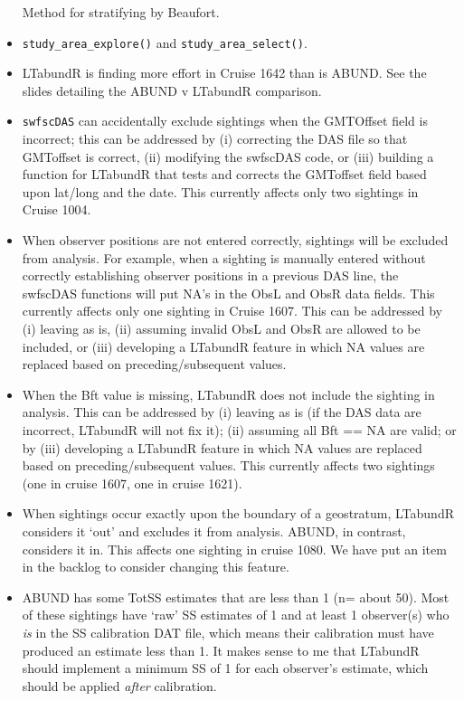 \documentclass[
]{book}
\begin{document}
\begin{itemize}
  Method for stratifying by Beaufort.
\item
  \texttt{study\_area\_explore()} and \texttt{study\_area\_select()}.
\item
  LTabundR is finding more effort in Cruise 1642 than is ABUND. See the slides detailing the ABUND v LTabundR comparison.
\item
  \texttt{swfscDAS} can accidentally exclude sightings when the GMTOffset field is incorrect; this can be addressed by (i) correcting the DAS file so that GMToffset is correct, (ii) modifying the swfscDAS code, or (iii) building a function for LTabundR that tests and corrects the GMToffset field based upon lat/long and the date. This currently affects only two sightings in Cruise 1004.
\item
  When observer positions are not entered correctly, sightings will be excluded from analysis. For example, when a sighting is manually entered without correctly establishing observer positions in a previous DAS line, the swfscDAS functions will put NA's in the ObsL and ObsR data fields. This currently affects only one sighting in Cruise 1607. This can be addressed by (i) leaving as is, (ii) assuming invalid ObsL and ObsR are allowed to be included, or (iii) developing a LTabundR feature in which NA values are replaced based on preceding/subsequent values.
\item
  When the Bft value is missing, LTabundR does not include the sighting in analysis. This can be addressed by (i) leaving as is (if the DAS data are incorrect, LTabundR will not fix it); (ii) assuming all Bft == NA are valid; or by (iii) developing a LTabundR feature in which NA values are replaced based on preceding/subsequent values. This currently affects two sightings (one in cruise 1607, one in cruise 1621).
\item
  When sightings occur exactly upon the boundary of a geostratum, LTabundR considers it `out' and excludes it from analysis. ABUND, in contrast, considers it in. This affects one sighting in cruise 1080. We have put an item in the backlog to consider changing this feature.
\item
  ABUND has some TotSS estimates that are less than 1 (n= about 50). Most of these sightings have `raw' SS estimates of 1 and at least 1 observer(s) who \emph{is} in the SS calibration DAT file, which means their calibration must have produced an estimate less than 1. It makes sense to me that LTabundR should implement a minimum SS of 1 for each observer's estimate, which should be applied \emph{after} calibration.

\end{itemize}
\end{document}
